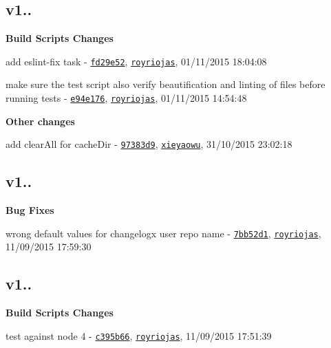 \subsection*{v1..}


\begin{DoxyItemize}
\item {\bfseries Build Scripts Changes}
\begin{DoxyItemize}
\item add eslint-\/fix task -\/ \href{https://github.com/royriojas/flat-cache/commit/fd29e52}{\tt fd29e52}, \href{https://github.com/royriojas}{\tt royriojas}, 01/11/2015 18\+:04\+:08
\item make sure the test script also verify beautification and linting of files before running tests -\/ \href{https://github.com/royriojas/flat-cache/commit/e94e176}{\tt e94e176}, \href{https://github.com/royriojas}{\tt royriojas}, 01/11/2015 14\+:54\+:48
\end{DoxyItemize}
\item {\bfseries Other changes}
\begin{DoxyItemize}
\item add clear\+All for cache\+Dir -\/ \href{https://github.com/royriojas/flat-cache/commit/97383d9}{\tt 97383d9}, \href{https://github.com/xieyaowu}{\tt xieyaowu}, 31/10/2015 23\+:02\+:18
\end{DoxyItemize}
\end{DoxyItemize}

\subsection*{v1..}


\begin{DoxyItemize}
\item {\bfseries Bug Fixes}
\begin{DoxyItemize}
\item wrong default values for changelogx user repo name -\/ \href{https://github.com/royriojas/flat-cache/commit/7bb52d1}{\tt 7bb52d1}, \href{https://github.com/royriojas}{\tt royriojas}, 11/09/2015 17\+:59\+:30
\end{DoxyItemize}
\end{DoxyItemize}

\subsection*{v1..}


\begin{DoxyItemize}
\item {\bfseries Build Scripts Changes}
\begin{DoxyItemize}
\item test against node 4 -\/ \href{https://github.com/royriojas/flat-cache/commit/c395b66}{\tt c395b66}, \href{https://github.com/royriojas}{\tt royriojas}, 11/09/2015 17\+:51\+:39
\end{DoxyItemize}
\end{DoxyItemize}

